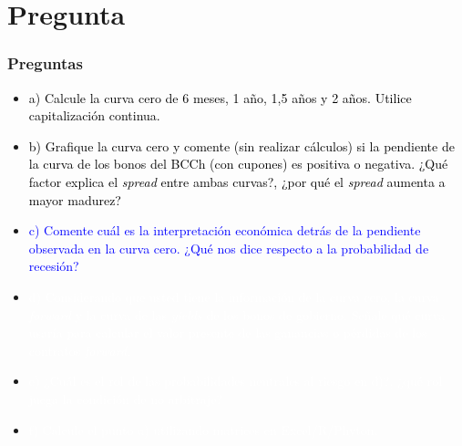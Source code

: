\documentclass{beamer}
\begin{document}
\section{Pregunta }
\begin{frame}
  \frametitle{Preguntas}
  \begin{itemize}
    \scriptsize
    \item {\textcolor{black}{a) Calcule la curva cero de 6 meses, 1 año, 1,5 años y 2 años. Utilice capitalización continua.}}
    \vspace{3pt}
    \item {\textcolor{black}{b) Grafique la curva cero y comente (sin realizar cálculos) si la pendiente de la curva de los bonos del BCCh (con cupones) es positiva o negativa. ¿Qué factor explica el \textit{spread} entre ambas curvas?, ¿por qué el \textit{spread} aumenta a mayor madurez?}}
    \vspace{3pt}
    \item {\Large\textcolor{blue}{c) Comente cuál es la interpretación económica detrás de la pendiente observada en la curva cero. ¿Qué nos dice respecto a la probabilidad de recesión?}}
    \vspace{3pt}
    \item {\textcolor{white}{d) Considerando que usted tiene la información de la curva cero, la curva \textit{forward} y la curva de las \textit{yields} de los bonos de gobierno. Señale qué curva usaría para calcular el valor presente de las ganancias o pérdidas de los contratos \textit{forward}.}}
    \vspace{3pt}
    \item {\textcolor{white}{e) ¿Cuál es el rol de las probabilidades neutrales al riesgo en d)?, ¿qué rol juega la condición de no arbitraje?}}
    \vspace{3pt}
    \item {\textcolor{white}{f) Calcule el punto a) utilizando matrices en Excel/R/Phyton.}}
    \vspace{3pt}
  \end{itemize}
\end{frame}
\end{document}
